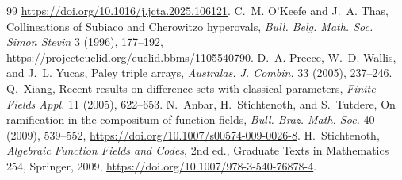 \documentclass[11pt]{article}
\theoremstyle{definition}\newtheorem{definition}[theorem]{Definition}
\theoremstyle{remark}\newtheorem{remark}[theorem]{Remark}
\begin{document}
\begin{thebibliography}{99}
\url{https://doi.org/10.1016/j.jcta.2025.106121}.
C.~M. O'Keefe and J.~A. Thas,
Collineations of Subiaco and Cherowitzo hyperovals,
\emph{Bull. Belg. Math. Soc. Simon Stevin} 3 (1996), 177--192,
\url{https://projecteuclid.org/euclid.bbms/1105540790}.
D.~A. Preece, W.~D. Wallis, and J.~L. Yucas,
Paley triple arrays, \emph{Australas. J. Combin.} 33 (2005), 237--246.
Q.~Xiang, Recent results on difference sets with classical parameters,
\emph{Finite Fields Appl.} 11 (2005), 622--653.
N.~Anbar, H.~Stichtenoth, and S.~Tutdere,
On ramification in the compositum of function fields,
\emph{Bull. Braz. Math. Soc.} 40 (2009), 539--552,
\url{https://doi.org/10.1007/s00574-009-0026-8}.
H.~Stichtenoth, \emph{Algebraic Function Fields and Codes}, 2nd ed.,
Graduate Texts in Mathematics 254, Springer, 2009,
\url{https://doi.org/10.1007/978-3-540-76878-4}.
\end{thebibliography}
\end{document}
